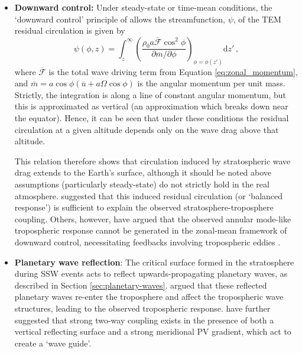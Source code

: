 \begin{itemize}
\item\textbf{Downward control:} Under steady-state or time-mean conditions, the
  `downward control' principle of \citet{Haynes1991} allows the streamfunction,
  $\psi$, of the TEM residual circulation is given by
  \begin{equation}
    \psi(\phi,z) =
    \int_z^{\infty}\left(\frac{\rho_0a\overline{\mathcal{F}}\cos^2\phi}{\partial\overline{m}/\partial\phi}\right)_{\phi=\phi(z')}\mathrm{d}z'\, ,
  \end{equation}
  where $\overline{\mathcal{F}}$ is the total wave driving term from Equation
  \ref{eq:zonal_momentum}, and
  $\overline{m}=a\cos\phi(\overline{u}+a\Omega\cos\phi)$ is the angular momentum
  per unit mass. Strictly, the integration is along a line of constant angular
  momentum, but this is approximated as vertical (an approximation which breaks
  down near the equator). Hence, it can be seen that under these conditions the
  residual circulation at a given altitude depends only on the wave drag above
  that altitude.

  This relation therefore shows that circulation induced by stratospheric wave
  drag extends to the Earth's surface, although it should be noted above
  assumptions (particularly steady-state) do not strictly hold in the real
  atmosphere. \citet{Thompson2006} suggested that this induced residual
  circulation (or `balanced response') is sufficient to explain the observed
  stratosphere-troposphere coupling. Others, however, have argued that the
  observed annular mode-like tropospheric response cannot be generated in the
  zonal-mean framework of downward control, necessitating feedbacks involving
  tropospheric eddies \citep{Kushner2004, Song2004}.


\item\textbf{Planetary wave reflection}: The critical surface formed in the
  stratosphere during SSW events acts to reflect upwards-propagating planetary
  waves, as described in Section
  \ref{sec:planetary-waves}. \citet{JudithPerlwitz2003} argued that these
  reflected planetary waves re-enter the troposphere and affect the tropospheric
  wave structures, leading to the observed tropospheric
  response. \citet{Shaw2010} have further suggested that strong two-way coupling
  exists in the presence of both a vertical reflecting surface and a strong
  meridional PV gradient, which act to create a `wave guide'. 


\end{itemize}
